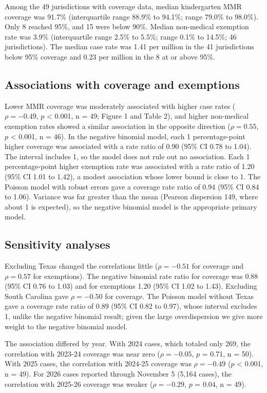 \documentclass[12pt]{article}
\begin{document}
Among the 49 jurisdictions with coverage data, median kindergarten MMR coverage was 91.7\% (interquartile range 88.9\% to 94.1\%; range 79.0\% to 98.0\%). Only 8 reached 95\%, and 15 were below 90\%. Median non-medical exemption rate was 3.9\% (interquartile range 2.5\% to 5.5\%; range 0.1\% to 14.5\%; 46 jurisdictions). The median case rate was 1.41 per million in the 41 jurisdictions below 95\% coverage and 0.23 per million in the 8 at or above 95\%.

\subsection*{Associations with coverage and exemptions}

Lower MMR coverage was moderately associated with higher case rates ($\rho = -0.49$, $p$ < 0.001, n = 49; Figure 1 and Table 2), and higher non-medical exemption rates showed a similar association in the opposite direction ($\rho = 0.55$, $p$ < 0.001, n = 46). In the negative binomial model, each 1 percentage-point higher coverage was associated with a rate ratio of 0.90 (95\% CI 0.78 to 1.04). The interval includes 1, so the model does not rule out no association. Each 1 percentage-point higher exemption rate was associated with a rate ratio of 1.20 (95\% CI 1.01 to 1.42), a modest association whose lower bound is close to 1. The Poisson model with robust errors gave a coverage rate ratio of 0.94 (95\% CI 0.84 to 1.06). Variance was far greater than the mean (Pearson dispersion 149, where about 1 is expected), so the negative binomial model is the appropriate primary model.

\subsection*{Sensitivity analyses}

Excluding Texas changed the correlations little ($\rho = -0.51$ for coverage and $\rho = 0.57$ for exemptions). The negative binomial rate ratio for coverage was 0.88 (95\% CI 0.76 to 1.03) and for exemptions 1.20 (95\% CI 1.02 to 1.43). Excluding South Carolina gave $\rho = -0.50$ for coverage. The Poisson model without Texas gave a coverage rate ratio of 0.89 (95\% CI 0.82 to 0.97), whose interval excludes 1, unlike the negative binomial result; given the large overdispersion we give more weight to the negative binomial model.

The association differed by year. With 2024 cases, which totaled only 269, the correlation with 2023-24 coverage was near zero ($\rho = -0.05$, $p$ = 0.71, n = 50). With 2025 cases, the correlation with 2024-25 coverage was $\rho = -0.49$ ($p$ < 0.001, n = 49). For 2026 cases reported through November 5 (5,164 cases), the correlation with 2025-26 coverage was weaker ($\rho = -0.29$, $p$ = 0.04, n = 49).
\end{document}
